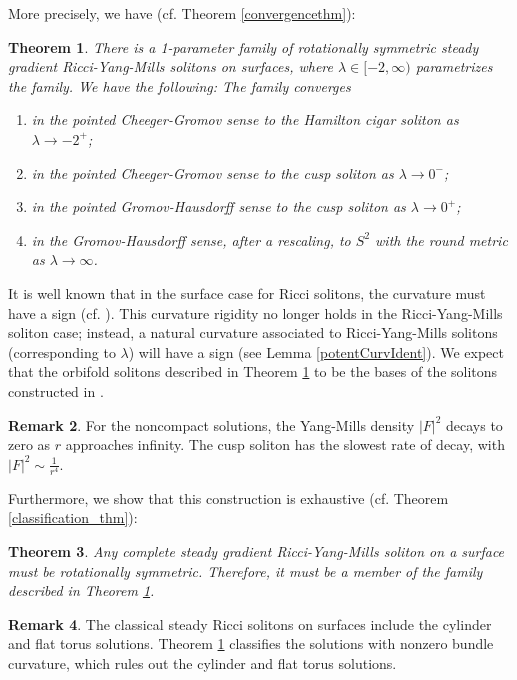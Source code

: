 \documentclass[12pt, a4paper, reqno, oneside]{amsart}
\numberwithin{equation}{section}
\theoremstyle{plain}
\newtheorem{theorem}{Theorem}[section]
\theoremstyle{definition}
\newtheorem{remark}[theorem]{Remark}
\theoremstyle{plain}
\begin{document}
More precisely, we have (cf. Theorem \ref{convergencethm}):
\begin{theorem}\label{mainthm1}
There is a 1-parameter family of rotationally symmetric steady gradient Ricci-Yang-Mills solitons on surfaces, where $\lambda\in [-2,\infty)$ parametrizes the family. We have the following: The family converges
  \begin{enumerate}[label=(\arabic*)]
    \item in the pointed Cheeger-Gromov sense to the Hamilton cigar soliton as $\lambda\to -2^{+}$;
    \item in the pointed Cheeger-Gromov sense to the cusp soliton as $\lambda\to 0^{-}$;
    \item in the pointed Gromov-Hausdorff sense to the cusp soliton as $\lambda\to 0^{+}$;
    \item in the Gromov-Hausdorff sense, after a rescaling, to $S^{2}$ with the round metric as $\lambda\to \infty$.
  \end{enumerate}
\end{theorem}

It is well known that in the surface case for Ricci solitons, the curvature must have a sign (cf. \cite{chow_RicciSolLowDim2023}). This curvature rigidity no longer holds in the Ricci-Yang-Mills soliton case; instead, a natural curvature associated to Ricci-Yang-Mills solitons (corresponding to $\lambda$) will have a sign (see Lemma \ref{potentCurvIdent}). We expect that the orbifold solitons described in Theorem \ref{mainthm1} to be the bases of the solitons constructed in \cite{streetsUstinovskiy_ClassificationGenKRSolitonCmplxSurf2020}.

\begin{remark}
  For the noncompact solutions, the Yang-Mills density $|F|^2$ decays to zero as $r$ approaches infinity. The cusp soliton has the slowest rate of decay, with $|F|^2\sim \frac{1}{r^4}$.
\end{remark}

Furthermore, we show that this construction is exhaustive (cf. Theorem \ref{classification_thm}):
\begin{theorem}\label{mainthm2}
  Any complete steady gradient Ricci-Yang-Mills soliton on a surface must be rotationally symmetric. Therefore, it must be a member of the family described in Theorem \ref{mainthm1}.
\end{theorem}

\begin{remark}
  The classical steady Ricci solitons on surfaces include the cylinder and flat torus solutions. Theorem \ref{mainthm1} classifies the solutions with nonzero bundle curvature, which rules out the cylinder and flat torus solutions.
\end{remark}
\end{document}
